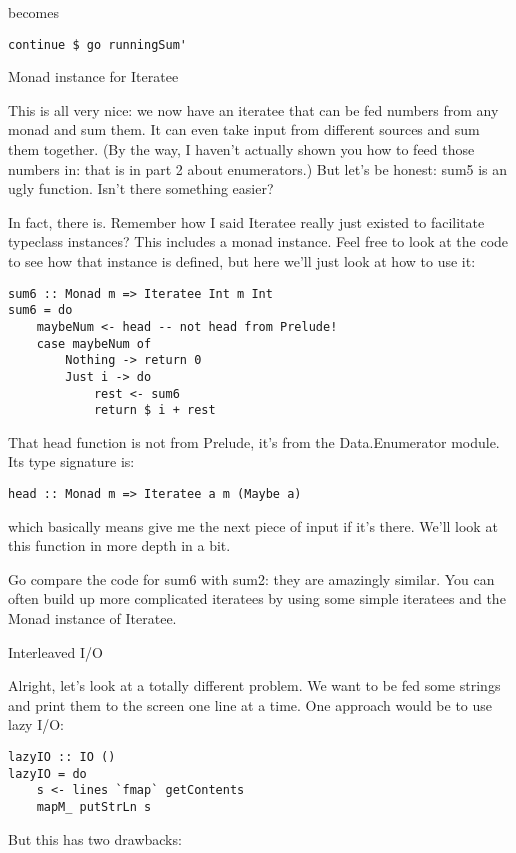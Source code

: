 becomes

\begin{lstlisting}
continue $ go runningSum'
\end{lstlisting}

Monad instance for Iteratee

This is all very nice: we now have an iteratee that can be fed numbers from any monad and sum them. It can even take input from different sources and sum them together. (By the way, I haven't actually shown you how to feed those numbers in: that is in part 2 about enumerators.) But let's be honest: sum5 is an ugly function. Isn't there something easier?

In fact, there is. Remember how I said Iteratee really just existed to facilitate typeclass instances? This includes a monad instance. Feel free to look at the code to see how that instance is defined, but here we'll just look at how to use it:

\begin{lstlisting}
sum6 :: Monad m => Iteratee Int m Int
sum6 = do
    maybeNum <- head -- not head from Prelude!
    case maybeNum of
        Nothing -> return 0
        Just i -> do
            rest <- sum6
            return $ i + rest
\end{lstlisting}

That head function is not from Prelude, it's from the Data.Enumerator module. Its type signature is:

\begin{lstlisting}
head :: Monad m => Iteratee a m (Maybe a)
\end{lstlisting}

which basically means give me the next piece of input if it's there. We'll look at this function in more depth in a bit.

Go compare the code for sum6 with sum2: they are amazingly similar. You can often build up more complicated iteratees by using some simple iteratees and the Monad instance of Iteratee.

Interleaved I/O

Alright, let's look at a totally different problem. We want to be fed some strings and print them to the screen one line at a time. One approach would be to use lazy I/O:

\begin{lstlisting}
lazyIO :: IO ()
lazyIO = do
    s <- lines `fmap` getContents
    mapM_ putStrLn s
\end{lstlisting}

But this has two drawbacks:

